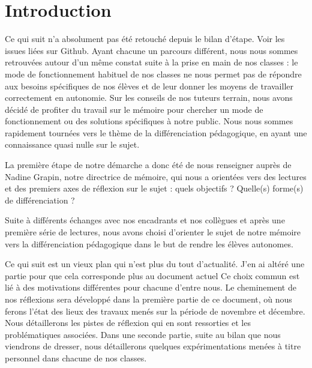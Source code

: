 \section{Introduction} %

{\color{red}Ce  qui suit n'a absolument pas été retouché depuis le bilan d'étape. Voir les issues liées sur Github.}
Ayant chacune un parcours différent, nous nous sommes retrouvées autour d’un même constat suite à la prise en main de nos classes : le mode de fonctionnement habituel de nos classes ne nous permet pas de répondre aux besoins spécifiques de nos élèves et de leur donner les moyens de travailler correctement en autonomie. Sur les conseils de nos tuteurs terrain, nous avons décidé de profiter du travail sur le mémoire pour chercher un mode de fonctionnement ou des solutions spécifiques à notre public. Nous nous sommes rapidement tournées vers le thème de la différenciation pédagogique, en ayant une connaissance quasi nulle sur le sujet.

La première étape de notre démarche a donc été de nous renseigner auprès de Nadine Grapin, notre directrice de mémoire, qui nous a orientées vers des lectures et des premiers axes de réflexion sur le sujet : quels objectifs ? Quelle(s) forme(s) de différenciation ?

Suite à différents échanges avec nos encadrants et nos collègues et après une première série de lectures, nous avons choisi d’orienter le sujet de notre mémoire vers la différenciation pédagogique dans le but de rendre les élèves autonomes.

{\color{red}Ce  qui suit est un vieux plan qui n'est plus du tout d'actualité. J'en ai altéré une partie pour que cela corresponde plus au document actuel}
Ce choix commun est lié à des motivations différentes pour chacune d’entre nous.
Le cheminement de nos réflexions sera développé dans la première partie de ce document, où nous ferons l’état des lieux des travaux menés sur la période de novembre et décembre. Nous détaillerons les pistes de réflexion qui en sont ressorties et les problématiques associées.
Dans une seconde partie, suite au bilan que nous viendrons de dresser, nous détaillerons quelques expérimentations menées à titre personnel dans chacune de nos classes.

